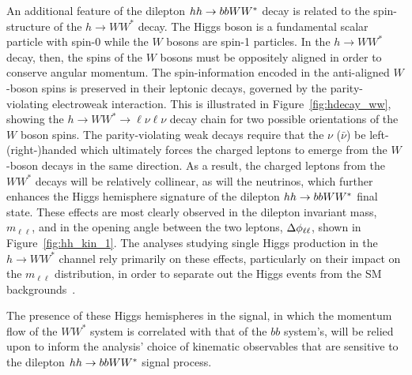 An additional feature of the dilepton $hh \rightarrow bbWW^*$ decay is related to the spin-structure
of the $h \rightarrow WW^*$ decay.
The Higgs boson is a fundamental scalar particle with spin-0 while the $W$ bosons are spin-1 particles.
In the $h \rightarrow WW^*$ decay, then, the spins of the $W$ bosons must be oppositely aligned in order
to conserve angular momentum.
The spin-information encoded in the anti-aligned $W$-boson spins is preserved in their leptonic decays, governed by
the parity-violating electroweak interaction.
This is illustrated in Figure~\ref{fig:hdecay_ww}, showing the $h \rightarrow WW^* \rightarrow \ell \nu \ell \nu$
decay chain for two possible orientations of the $W$ boson spins.
The parity-violating weak decays require that the $\nu$ ($\bar{\nu}$) be left-(right-)handed which ultimately
forces the charged leptons to emerge from the $W$-boson decays in the same direction.
As a result, the charged leptons from the $WW^*$ decays will be relatively collinear,
as will the neutrinos, which further enhances the Higgs hemisphere signature of the dilepton $hh \rightarrow bbWW^*$ final state.
These effects are most clearly observed in the dilepton invariant mass, $m_{\ell \ell}$, and
in the opening angle between the two leptons, $\Delta \phi_{\ell\ell}$, shown in Figure~\ref{fig:hh_kin_1}.
The analyses studying single Higgs production in the $h \rightarrow WW^*$ channel rely primarily on these effects,
particularly on their impact on the $m_{\ell \ell}$ distribution, in order to separate out the
Higgs events from the SM backgrounds~\cite{Aaboud:2018jqu,Aad:2016lvc,ATLAS:2014aga}.


The presence of these Higgs hemispheres in the signal, in which the momentum flow of the $WW^*$ system
is correlated with that of the $bb$ system's, will be relied upon to inform the analysis' choice
of kinematic observables that are sensitive to the dilepton $hh \rightarrow bbWW^*$ signal process.

